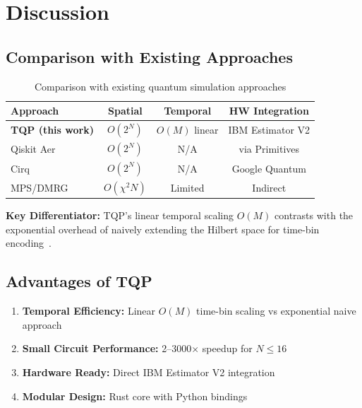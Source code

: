 \documentclass[aps,prx,twocolumn,superscriptaddress,floatfix]{revtex4-2}
\begin{document}
\section{Discussion}

\subsection{Comparison with Existing Approaches}

\begin{table}[htbp]
\caption{Comparison with existing quantum simulation approaches}
\label{tab:comparison}
\begin{ruledtabular}
\begin{tabular}{lccc}
Approach & Spatial & Temporal & HW Integration \\
\hline
\textbf{TQP (this work)} & $O(2^N)$ & $O(M)$ linear & IBM Estimator V2 \\
Qiskit Aer~\cite{qiskit_aer} & $O(2^N)$ & N/A & via Primitives \\
Cirq & $O(2^N)$ & N/A & Google Quantum \\
MPS/DMRG~\cite{schollwock2011dmrg} & $O(\chi^2 N)$ & Limited & Indirect \\
\end{tabular}
\end{ruledtabular}
\end{table}

\textbf{Key Differentiator:} TQP's linear temporal scaling $O(M)$ contrasts with the exponential overhead of naively extending the Hilbert space for time-bin encoding~\cite{brecht2015photon,menicucci2011temporal}.

\subsection{Advantages of TQP}

\begin{enumerate}
    \item \textbf{Temporal Efficiency:} Linear $O(M)$ time-bin scaling vs exponential naive approach
    \item \textbf{Small Circuit Performance:} 2--3000$\times$ speedup for $N \le 16$
    \item \textbf{Hardware Ready:} Direct IBM Estimator V2 integration
    \item \textbf{Modular Design:} Rust core with Python bindings
\end{enumerate}
\end{document}
